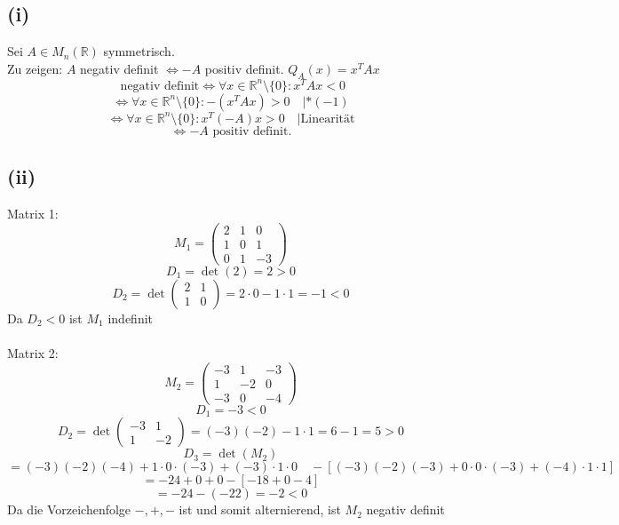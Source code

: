 \documentclass{article}
\begin{document}
\subsection*{(i) }
Sei $A \in M_n(\mathbb{R})$ symmetrisch. \\
Zu zeigen: $A$ negativ definit $\Longleftrightarrow -A$ positiv definit.
$Q_A(x)=x^TAx$
\[ \text{ negativ definit} \iff \forall x \in \mathbb{R}^n \setminus \{0\}: x^T A x < 0 \]
\[\iff \forall x \in \mathbb{R}^n \setminus \{0\}: -(x^T A x) > 0 \quad | *(-1) \]
\[\iff \forall x \in \mathbb{R}^n \setminus \{0\}: x^T (-A) x > 0 \quad | \text{Linearität} \]
\[\iff -A \text{ positiv definit.}\]

\subsection*{(ii)}
Matrix 1:
\[M_1 = \begin{pmatrix} 2 & 1 & 0 \\ 1 & 0 & 1 \\ 0 & 1 & -3 \end{pmatrix}\]
\[D_1 = \det(2) = 2 > 0\]
\[D_2 = \det \begin{pmatrix} 2 & 1 \\ 1 & 0 \end{pmatrix} = 2\cdot 0 - 1\cdot 1 = -1 < 0\]
Da $D_2 < 0$ ist $M_1$ indefinit \\
\newline \\
Matrix 2:
\[M_2 = \begin{pmatrix} -3 & 1 & -3 \\ 1 & -2 & 0 \\ -3 & 0 & -4 \end{pmatrix}\]
\[D_1 = -3 < 0\]
\[D_2 = \det \begin{pmatrix} -3 & 1 \\ 1 & -2 \end{pmatrix} = (-3)(-2) - 1\cdot 1 = 6 - 1 = 5 > 0\]
\[D_3 = \det(M_2)\]
\[= (-3)(-2)(-4) + 1\cdot 0 \cdot (-3) + (-3)\cdot 1 \cdot 0 \quad - [(-3)(-2)(-3) + 0\cdot 0 \cdot (-3) + (-4)\cdot 1 \cdot 1] \]
\[= -24 + 0 + 0 - [-18 + 0 - 4] \]
\[= -24 - (-22) = -2 < 0\]
Da die Vorzeichenfolge $-, +, -$ ist und somit alternierend, ist $M_2$ negativ definit
\end{document}
